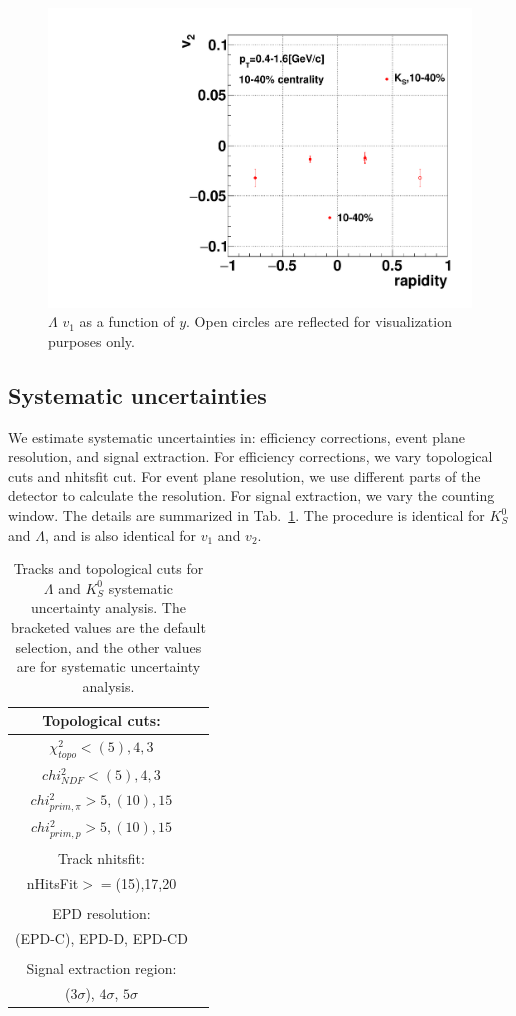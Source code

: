 \begin{figure}[h]
\includegraphics[width=0.5\linewidth]{chapterX/fig/ks_v2_sig/ks_v2vy_cent1_ptbin0_r.pdf}
\caption{$\Lambda$ $v_1$ as a function of $y$. Open circles are reflected for visualization purposes only.}
\label{fig:ksv21040}
\end{figure}



\subsection{Systematic uncertainties}
We estimate systematic uncertainties in: efficiency corrections, event plane resolution, and signal extraction. For efficiency corrections, we vary topological cuts and nhitsfit cut. For event plane resolution, we use different parts of the detector to calculate the resolution. For signal extraction, we vary the counting window. The details are summarized in Tab.~\ref{tab:kfptcldkscutssys}. The procedure is identical for $K^0_S$ and $\Lambda$, and is also identical for $v_{1}$ and $v_{2}$.

\begin{table}[ht]
\caption{Tracks and topological cuts for $\Lambda$ and $K^0_S$ systematic uncertainty analysis. The bracketed values are the default selection, and the other values are for systematic uncertainty analysis.}
\label{tab:kfptcldkscutssys}
\begin{tabular}{|c|c|}
\hline
Topological cuts: \\ \hline
$\chi^{2}_{topo}<(5),4,3$ \\ \hline
$chi^{2}_{NDF}<(5),4,3$ \\ \hline
$chi^{2}_{prim,\pi}>5,(10),15$ \\ \hline 
$chi^{2}_{prim,p}>5,(10),15$ \\ \hline
\\ \hline
Track nhitsfit: \\ \hline
nHitsFit$>=$(15),17,20 \\ \hline
\\ \hline
EPD resolution: \\ \hline
(EPD-C), EPD-D, EPD-CD \\ \hline
\\ \hline
Signal extraction region: \\ \hline
($3\sigma$), $4\sigma$, $5\sigma$
\\ \hline
\end{tabular}
\end{table}

